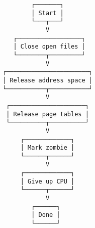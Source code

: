 \documentclass[varwidth,crop]{standalone}
\begin{document}
\begin{verbatim}
        ┌───────┐
        │ Start │
        └───┬───┘
            V
   ┌──────────────────┐
   │ Close open files │
   └────────┬─────────┘
            V
┌───────────────────────┐
│ Release address space │
└───────────┬───────────┘
            V
 ┌─────────────────────┐
 │ Release page tables │
 └──────────┬──────────┘
            V
     ┌─────────────┐
     │ Mark zombie │
     └──────┬──────┘
            V     
     ┌─────────────┐
     │ Give up CPU │
     └──────┬──────┘
            V
        ┌──────┐
        │ Done │
        └──────┘
\end{verbatim}
\end{document}
